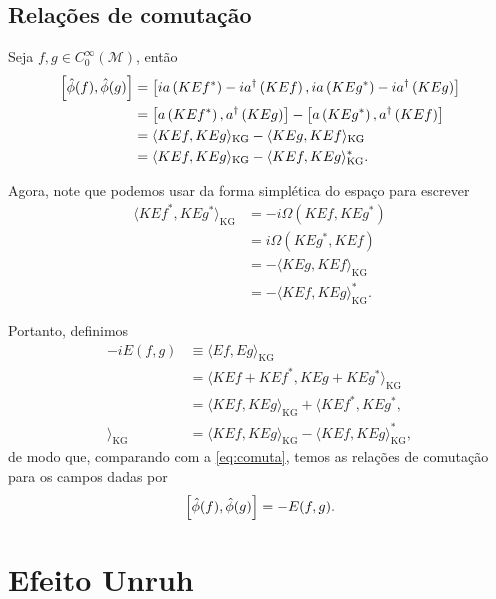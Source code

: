 \documentclass[12pt]{article}
\newcommand{\m}{\mathcal{M}}
\newcommand{\innerkg}[2]{\langle#1,#2\rangle_{\text{KG}}}
\begin{document}
\subsection*{Relações de comutação}
Seja \(f,g\in C_0^{\infty}(\m)\), então
\begin{subequations}
    \begin{align}
        \relax\left[\hat{\phi}(f),\hat{\phi}(g)\right]&=\left[ia\left(KEf^*\right)-ia^\dagger\left(KEf\right),ia\left(KEg^*\right)-ia^\dagger\left(KEg\right)\right]\\
        &=\left[a\left(KEf^*\right),a^\dagger\left(KEg\right)\right]-\left[a\left(KEg^*\right),a^\dagger\left(KEf\right)\right]\\
        &=\innerkg{KEf}{KEg}-\innerkg{KEg}{KEf}\\
        &=\innerkg{KEf}{KEg}-\innerkg{KEf}{KEg}^*.
    \end{align}
    \label{eq:comuta}
\end{subequations}

Agora, note que podemos usar da forma simplética do espaço para escrever
\begin{subequations}
    \begin{align}
        \innerkg{KEf^*}{KEg^*}&=-i\Omega(KEf,KEg^*)\\
        &=i\Omega(KEg^*,KEf)\\
        &=-\innerkg{KEg}{KEf}\\
        &=-\innerkg{KEf}{KEg}^*.
    \end{align}
\end{subequations}

Portanto, definimos
\begin{subequations}
    \begin{align}
        -iE(f,g)&\equiv\innerkg{Ef}{Eg}\\
        &=\innerkg{KEf+KEf^*}{KEg+KEg^*}\\
        &=\innerkg{KEf}{KEg}+\innerkg{KEf^*,KEg^*}\\
        &=\innerkg{KEf}{KEg}-\innerkg{KEf}{KEg}^*,
        \label{eq:def-E}
    \end{align}
\end{subequations}
de modo que, comparando com a \cref{eq:comuta}, temos as relações de comutação para os campos dadas por
\begin{equation}
    \relax\left[\hat{\phi}(f),\hat{\phi}(g)\right]=-E(f,g).
\end{equation}


\section{Efeito Unruh}
\end{document}
